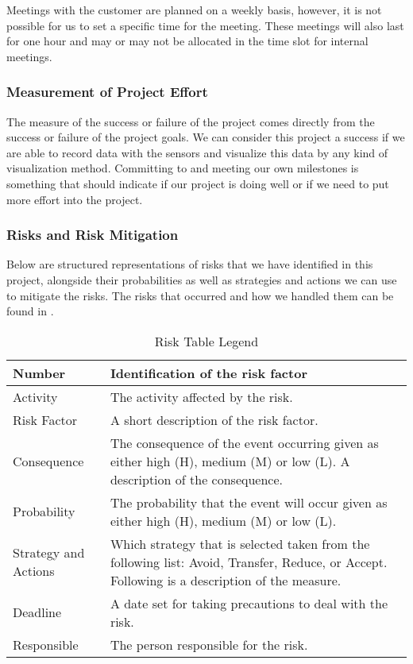 \documentclass[../document.tex]{subfiles}
\begin{document}
Meetings with the customer are planned on a weekly basis, however, it is not possible for us to set a specific time for the meeting. These meetings will also last for one hour and may or may not be allocated in the time slot for internal meetings.

\subsubsection{Measurement of Project Effort}
The measure of the success or failure of the project comes directly from the success or failure of the project goals. We can consider this project a success if we are able to record data with the sensors and visualize this data by any kind of visualization method. Committing to and meeting our own milestones is something that should indicate if our project is doing well or if we need to put more effort into the project.

\subsubsection{Risks and Risk Mitigation}
\label{risks_and_risk_mitigation}
Below are structured representations of risks that we have identified in this project, alongside their probabilities as well as strategies and actions we can use to mitigate the risks. The risks that occurred and how we handled them can be found in .

\begin{table}[H]
\caption{Risk Table Legend}
\begin{tabularx}{\textwidth}{|l|X|}
\hline
Number
&Identification of the risk factor
\\ \hline Activity
&The activity affected by the risk.
\\ \hline Risk Factor
&A short description of the risk factor.
\\ \hline Consequence
&The consequence of the event occurring given as either high (H), medium (M) or low (L). A description of the consequence.
\\ \hline Probability
&The probability that the event will occur given as either high (H), medium (M) or low (L).
\\ \hline Strategy and Actions
&Which strategy that is selected taken from the following list: Avoid, Transfer, Reduce, or Accept. Following is a description of the measure.
\\ \hline Deadline
&A date set for taking precautions to deal with the risk.
\\ \hline Responsible
&The person responsible for the risk.
\\ \hline
\end{tabularx}
\end{table}
\end{document}
